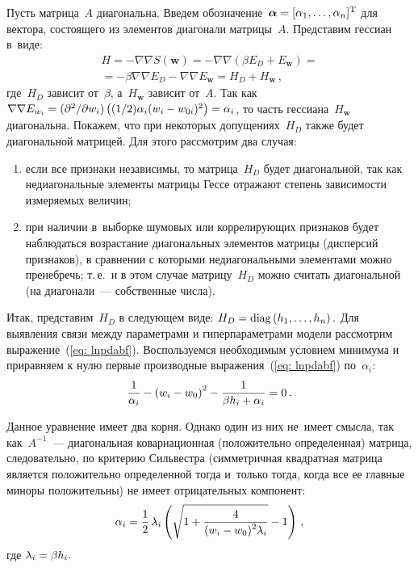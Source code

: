 \begin{multicols}{2}
Пусть матрица~$A$ диагональна. Введем
обозначение~$\boldsymbol{\alpha}\hm=[\alpha_1, \ldots ,\alpha_n]^{\mathrm{T}}$ для
вектора, состоящего из элементов диагонали матрицы~$A$. Представим
гессиан в~виде:
\begin{multline*}
H=- \nabla \nabla S(\mathbf{w})=-\nabla\nabla\left(\beta E_D + E_\mathbf{w}\right)={}\\
{}=
-\beta\nabla\nabla E_D-\nabla\nabla E_\mathbf{w}=H_D+H_{\mathbf{w}}\,,
\end{multline*}
где~$H_D$ зависит от~$\beta$, а~$H_\mathbf{w}$ зависит от~$A$.
Так как $\nabla\nabla E_{w_i}\hm=({\partial^2}/{\partial w_i}) 
\left((1/2)\alpha_i (w_i\hm-w_{0i})^2\right)\hm=\alpha_i$, то часть гессиана~$H_\mathbf{w}$ 
диагональна. Покажем, что при некоторых допущениях~$H_D$ также будет диагональной матрицей. 
Для этого рассмотрим два случая:
\begin{enumerate}[(1)]
  \item если все признаки независимы, то матрица~$H_D$ будет диагональной, 
  так как недиагональные элементы матрицы Гессе отражают степень зависимости 
  измеряемых величин;
  \item при наличии в~выборке шумовых или коррелирующих признаков будет 
  наблюдаться возрас\-та\-ние диагональных элементов матрицы (дисперсий признаков), 
  в сравнении с которыми недиагональными элементами можно пре\-неб\-речь; т.\,е.\ 
  и в этом случае матрицу~$H_D$ можно считать диагональной (на диагонали~--- 
  собственные числа).
\end{enumerate}

Итак, представим~$H_D$ в следующем виде: $H_D \hm=
\mathrm{diag}\left(h_1, \ldots ,h_n\right).$ Для выявления связи между параметрами
и гиперпараметрами модели рас\-смот\-рим выражение~(\ref{eq: lnpdabf}).
Воспользуемся необходимым условием минимума и приравняем к нулю
первые производные выражения~(\ref{eq: lnpdabf}) по~$\alpha_i$:
\begin{equation*}
\displaystyle\frac{\displaystyle 1\mathstrut}{\displaystyle \alpha_i\mathstrut}-\left(w_{i}-w_{0}\right)^2-\displaystyle\frac{\displaystyle 1\mathstrut}{\displaystyle \beta h_i+\alpha_i\mathstrut}=0\,.
\end{equation*}

Данное уравнение имеет два корня. Однако один из них не~имеет
смысла, так как~$A^{-1}$~--- диагональная ковариационная
(положительно определенная) матрица, следовательно, по критерию
Сильвестра (симметричная квадратная матрица является положительно
определенной тогда и~только тогда, когда все ее главные миноры
положительны) не имеет отрицательных компонент:
\begin{equation}
\label {eq: alfa}
\alpha_i=\displaystyle\frac{\displaystyle 1\mathstrut}{\displaystyle 2\mathstrut}\,\lambda_i\left(\sqrt{1+\displaystyle\frac{\displaystyle 4\mathstrut}{\displaystyle (w_{i}-w_{0})^{2}\lambda_i\mathstrut}}-1\right)\,,
\end{equation}
где $\lambda_i\hm=\beta h_i.$


\end{multicols}
